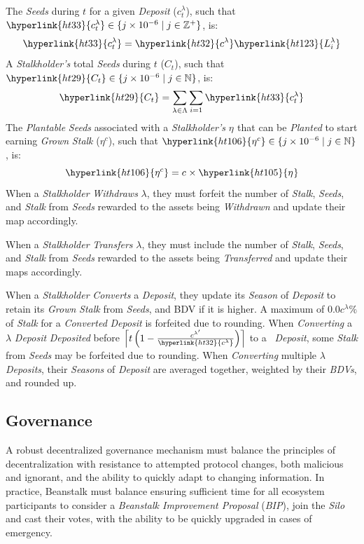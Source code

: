\documentclass[tikz]{article}
\newcommand{\term}[1]{\textsl{#1}}
\newcommand{\Bean}{} %
\newcommand{\bean}{} %
\begin{document}
The \term{Seeds} during \hyperlink{ht204}{$t$} for a given \term{Deposit} (\hyperlink{ht33}{$c_{t}^{\lambda}$}), such that $\hyperlink{ht33}{c_{t}^{\lambda}} \in \{j \times 10^{-6} \mid j \in \mathbb{Z}^{+} \}$, is:
$$\hyperlink{ht33}{c_{t}^{\lambda}} = \hyperlink{ht32}{c^{\lambda}} \hyperlink{ht123}{L_i^{\lambda}}$$
A \term{Stalkholder's} total \term{Seeds} during \hyperlink{ht204}{$t$} (\hyperlink{ht29}{$C_t$}), such that $\hyperlink{ht29}{C_t} \in \{j \times 10^{-6} \mid j \in \mathbb{N} \}$, is:
$$\hyperlink{ht29}{C_t} = \sum_{\lambda \in \Lambda} \sum_{i=1} \hyperlink{ht33}{c_{t}^{\lambda}}$$
The \term{Plantable} \term{Seeds} associated with a \term{Stalkholder's} \hyperlink{ht105}{$\eta^{\bean}$} that can be \term{Planted} to start earning \term{Grown} \term{Stalk} (\hyperlink{ht106}{$\eta^{c}$}), such that $\hyperlink{ht106}{\eta^{c}} \in \{j \times 10^{-6} \mid j \in \mathbb{N} \}$, is:
$$\hyperlink{ht106}{\eta^{c}} = c^{\bean} \times \hyperlink{ht105}{\eta^{\bean}}$$
When a \term{Stalkholder} \term{Withdraws} \hyperlink{ht126}{$\lambda$}, they must forfeit the number of \term{Stalk}, \term{Seeds}, and \term{Stalk} from \term{Seeds} rewarded to the assets being \term{Withdrawn} and update their map accordingly.

When a \term{Stalkholder} \term{Transfers} \hyperlink{ht126}{$\lambda$}, they must include the number of \term{Stalk}, \term{Seeds}, and \term{Stalk} from \term{Seeds} rewarded to the assets being \term{Transferred} and update their maps accordingly.

When a \term{Stalkholder} \term{Converts} a \term{Deposit}, they update its \term{Season} of \term{Deposit} to retain its \term{Grown} \term{Stalk} from \term{Seeds}, and BDV if it is higher. A maximum of $0.0c^\lambda\%$ of \term{Stalk} for a \term{Converted} \term{Deposit} is forfeited due to rounding. When \term{Converting} a \hyperlink{ht126}{$\lambda$} \term{Deposit} \term{Deposited} before $\left\lceil t \left(1 - \frac{c^{\lambda'}}{\hyperlink{ht32}{c^{\lambda}}}\right) \right\rceil$ to a \Bean\ \term{Deposit}, some \term{Stalk} from \term{Seeds} may be forfeited due to rounding. When \term{Converting} multiple \hyperlink{ht126}{$\lambda$} \term{Deposits}, their \term{Seasons} of \term{Deposit} are averaged together, weighted by their \term{BDVs}, and rounded up.

\subsection{Governance}
\vspace*{-1mm}
A robust decentralized governance mechanism must balance the principles of decentralization with resistance to attempted protocol changes, both malicious and ignorant, and the ability to quickly adapt to changing information. In practice, Beanstalk must balance ensuring sufficient time for all ecosystem participants to consider a \term{Beanstalk Improvement Proposal} (\term{BIP}), join the \term{Silo} and cast their votes, with the ability to be quickly upgraded in cases of emergency. 
\end{document}
